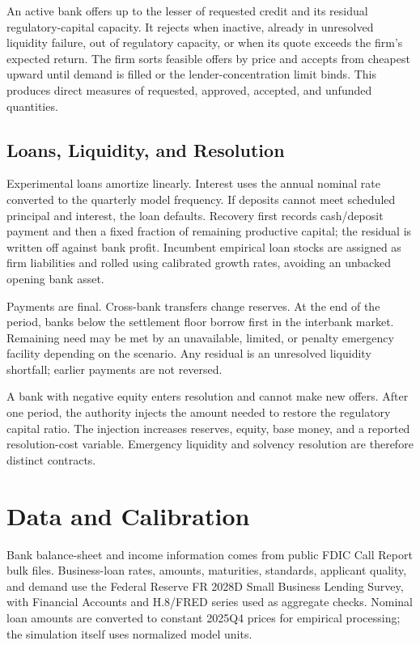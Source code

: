 \documentclass[11pt,a4paper]{article}
\begin{document}
An active bank offers up to the lesser of requested credit and its residual regulatory-capital capacity. It rejects when inactive, already in unresolved liquidity failure, out of regulatory capacity, or when its quote exceeds the firm's expected return. The firm sorts feasible offers by price and accepts from cheapest upward until demand is filled or the lender-concentration limit binds. This produces direct measures of requested, approved, accepted, and unfunded quantities.

\subsection{Loans, Liquidity, and Resolution}

Experimental loans amortize linearly. Interest uses the annual nominal rate converted to the quarterly model frequency. If deposits cannot meet scheduled principal and interest, the loan defaults. Recovery first records cash/deposit payment and then a fixed fraction of remaining productive capital; the residual is written off against bank profit. Incumbent empirical loan stocks are assigned as firm liabilities and rolled using calibrated growth rates, avoiding an unbacked opening bank asset.

Payments are final. Cross-bank transfers change reserves. At the end of the period, banks below the settlement floor borrow first in the interbank market. Remaining need may be met by an unavailable, limited, or penalty emergency facility depending on the scenario. Any residual is an unresolved liquidity shortfall; earlier payments are not reversed.

A bank with negative equity enters resolution and cannot make new offers. After one period, the authority injects the amount needed to restore the regulatory capital ratio. The injection increases reserves, equity, base money, and a reported resolution-cost variable. Emergency liquidity and solvency resolution are therefore distinct contracts.

\section{Data and Calibration}

Bank balance-sheet and income information comes from public FDIC Call Report bulk files. Business-loan rates, amounts, maturities, standards, applicant quality, and demand use the Federal Reserve FR 2028D Small Business Lending Survey, with Financial Accounts and H.8/FRED series used as aggregate checks. Nominal loan amounts are converted to constant 2025Q4 prices for empirical processing; the simulation itself uses normalized model units.
\end{document}
